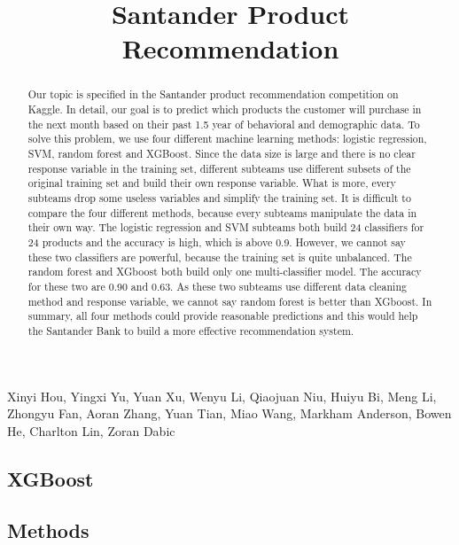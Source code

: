 \documentclass{article}
\title{Santander Product Recommendation}
\begin{document}
	\maketitle
	\begin{center}\begin{Large} Xinyi Hou,
			Yingxi Yu,
			Yuan Xu,
			Wenyu Li,
			Qiaojuan Niu,
			Huiyu Bi,
			Meng Li,
			Zhongyu Fan,
			Aoran Zhang,
			Yuan Tian,
			Miao Wang,
			Markham Anderson,
			Bowen He,
			Charlton Lin,
			Zoran Dabic \end{Large}\end{center}
	\begin{spacing}{1}
		\begin{large}

\begin{abstract}
	 Our topic is specified in the Santander product recommendation competition on Kaggle. In detail, our goal is to predict which products the customer will purchase in the next month based on their past 1.5 year of behavioral and demographic data. To solve this problem, we use four different machine learning methods: logistic regression, SVM, random forest and XGBoost. Since the data size is large and there is no clear response variable in the training set, different subteams use different subsets of the original training set and build their own response variable. What is more, every subteams drop some useless variables and simplify the training set. It is difficult to compare the four different methods, because every subteams manipulate the data in their own way. The logistic regression and SVM subteams both build 24 classifiers for 24 products and the accuracy is high, which is above 0.9. However, we cannot say these two classifiers are powerful, because the training set is quite unbalanced. The random forest and XGboost both build only one multi-classifier model. The accuracy for these two are 0.90 and 0.63. As these two subteams use different data cleaning method and response variable, we cannot say random forest is better than XGboost. In summary, all four methods could provide reasonable predictions and this would help the Santander Bank to build a more effective recommendation system.
\end{abstract}

\section{XGBoost}

\subsection{Methods}


\end{large}
\end{spacing}
\end{document}
